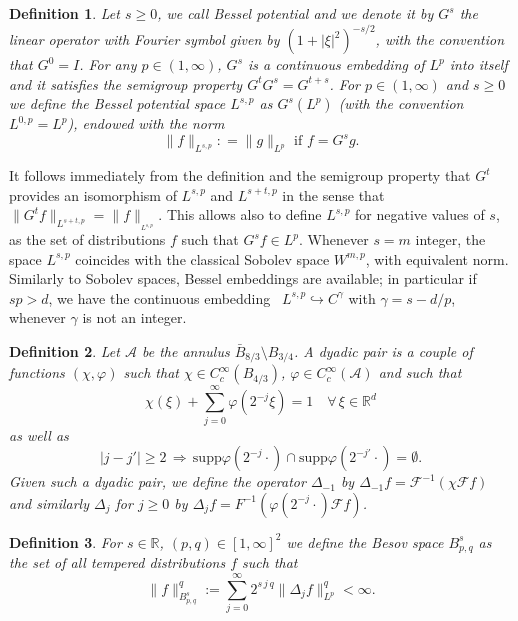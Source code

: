 \documentclass[10pt]{article}
\newcommand{\assign}{:=}
\newtheorem{definition}{Definition}
\begin{document}
\begin{definition}
  \label{appendixA2 defn bessel}Let $s \geqslant 0$, we call Bessel potential
  and we denote it by $G^s$ the linear operator with Fourier symbol given by
  $(1 + | \xi |^2)^{- s / 2}$, with the convention that $G^0 = I$. For any $p
  \in (1, \infty)$, $G^s$ is a continuous embedding of $L^p$ into itself and
  it satisfies the semigroup property $G^t G^s = G^{t + s}$. For $p \in (1,
  \infty)$ and $s \geqslant 0$ we define the Bessel potential space $L^{s, p}$
  as $G^s (L^p)$ (with the convention $L^{0, p} = L^p$), endowed with the norm
  \[ \| f \|_{L^{s, p}} : = \| g \|_{L^p}  \text{ if } f = G^s g. \]
\end{definition}

It follows immediately from the definition and the semigroup property that
$G^t$ provides an isomorphism of $L^{s, p}$ and $L^{s + t, p}$ in the sense
that $\| G^t f \|_{L^{s + t, p}} = \| f \|_{_{L^{s, p}}}$. This allows also to
define $L^{s, p}$ for negative values of $s$, as the set of distributions $f$
such that $G^s f \in L^p$. Whenever $s = m$ integer, the space $L^{s, p}$
coincides with the classical Sobolev space $W^{m, p}$, with equivalent norm.
Similarly to Sobolev spaces, Bessel embeddings are available; in particular if
$s p > d$, we have the continuous embedding \ $L^{s, p} \hookrightarrow
C^{\gamma}$ with $\gamma = s - d / p$, whenever $\gamma$ is not an integer.

\begin{definition}
  \label{appendixA2 dyadic pair}Let $\mathcal{A}$ be the annulus $\bar{B}_{8 /
  3} \setminus B_{3 / 4}$. A dyadic pair is a couple of functions $(\chi,
  \varphi)$ such that $\chi \in C^{\infty}_c (B_{4 / 3})$, $\varphi \in
  C^{\infty}_c (\mathcal{A})$ and such that
  \[ \chi (\xi) + \sum_{j = 0}^{\infty} \varphi (2^{- j} \xi) = 1 \quad
     \forall \, \xi \in \mathbb{R}^d \]
  as well as
  \[ | j - j' | \geqslant 2 \, \Rightarrow \, \text{supp} \varphi (2^{- j}
     \cdot) \cap \text{supp} \varphi (2^{- j'} \cdot) = \emptyset . \]
  Given such a dyadic pair, we define the operator $\Delta_{- 1}$ by
  $\Delta_{- 1} f = \mathcal{F}^{- 1} (\chi \mathcal{F} f)$ and similarly
  $\Delta_j$ for $j \geqslant 0$ by $\Delta_j f = F^{- 1} (\varphi (2^{- j}
  \cdot) \mathcal{F} f)$.
\end{definition}

\begin{definition}
  \label{appendixA2 defn besov}For $s \in \mathbb{R}$, $(p, q) \in [1,
  \infty]^2$ we define the Besov space $B^s_{p, q}$ as the set of all tempered
  distributions $f$ such that
  \[ \| f \|_{B^s_{p, q}}^q \assign \sum_{j = 0}^{\infty} 2^{s \, j \, q} \|
     \Delta_j f \|_{L^p}^q < \infty . \]
\end{definition}
\end{document}
